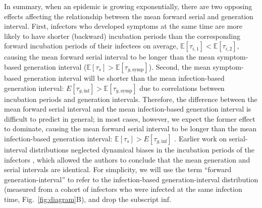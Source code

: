 \documentclass[12pt]{article}
\newcommand{\fref}[1]{Fig.~\ref{fig:#1}}
\begin{document}
In summary, when an epidemic is growing exponentially, there are two opposing effects affecting the relationship between the mean forward serial and generation interval.
First, infectors who developed symptoms at the same time are more likely to have shorter (backward) incubation periods than the corresponding forward incubation periods of their infectees on average, $\mathbb E[\tau_{i, 1}] < \mathbb E[\tau_{i, 2}]$, causing the mean forward serial interval to be longer than the mean symptom-based generation interval ($\mathbb E[\tau_s] > \mathbb E[\tau_{g, \mathrm{symp}}]$).
Second, the mean symptom-based generation interval will be shorter than the mean infection-based generation interval: $E[\tau_{g, \mathrm{inf}}] > \mathbb E[\tau_{g, \mathrm{symp}}]$ due to correlations between incubation periods and generation intervals.
Therefore, the difference between the mean forward serial interval and the mean infection-based generation interval is difficult to predict in general; in most cases, however, we expect the former effect to dominate, causing the mean forward serial interval to be longer than the mean infection-based generation interval: $\mathbb E[\tau_s] > E[\tau_{g, \mathrm{inf}}]$ \citep{park2021forward}.
Earlier work on serial-interval distributions neglected dynamical biases in the incubation periods of the infectors \citep{svensson2007note,britton2019estimation}, which allowed the authors to conclude that the mean generation and serial intervals are identical.
For simplicity, we will use the term ``forward generation-interval'' to refer to the infection-based generation-interval distribution (measured from a cohort of infectors who were infected at the same infection time, \fref{diagram}B), and drop the subscript $\mathrm{inf}$.
\end{document}
